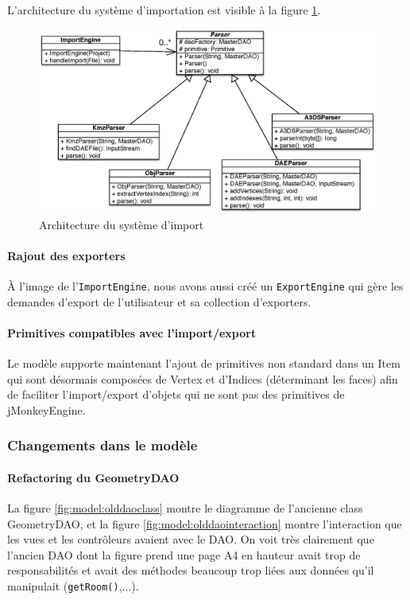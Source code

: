		L'architecture du système d'importation est visible à la figure \ref{fig:model:parsersarchi}.

		\begin{figure}
			\center
			\includegraphics[width=\textwidth]{iteration3/fig/ParsersArchi.eps}
			\caption{\label{fig:model:parsersarchi} Architecture du système d'import}
		\end{figure}

		\paragraph{Rajout des exporters}
		À l'image de l'\texttt{ImportEngine}, nous avons aussi créé un 
		\texttt{ExportEngine} qui gère les demandes d'export de l'utilisateur et
		sa collection d'exporters.

		\paragraph{Primitives compatibles avec l'import/export}
		Le modèle supporte maintenant l'ajout de primitives non standard dans un
		Item qui sont désormais composées de Vertex et d'Indices (déterminant 
		les faces) afin de faciliter l'import/export d'objets qui ne sont pas des
		primitives de jMonkeyEngine.

	\subsubsection{Changements dans le modèle}

		\paragraph{Refactoring du GeometryDAO}
		La figure \ref{fig:model:olddaoclass} montre le diagramme de l'ancienne
		class GeometryDAO, et la figure \ref{fig:model:olddaointeraction} montre
		l'interaction que les vues et les contrôleurs avaient avec le DAO. On
		voit très clairement que l'ancien DAO dont la figure prend une page A4
		en hauteur avait trop de responsabilités et avait des méthodes beaucoup
		trop liées aux données qu'il manipulait (\texttt{getRoom()},...).\\

